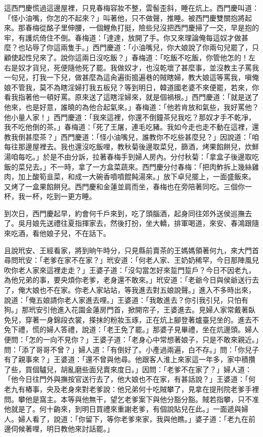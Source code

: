 這西門慶慌過這邊屋裡，只見春梅容妝不整，雲髻歪斜，睡在炕上。西門慶叫道：「怪小油嘴，你怎的不起來？」叫著他，只不做聲，推睡。被西門慶雙關抱將起來。那春梅從酩子里伸腰，一個鯉魚打挺，險些兒沒把西門慶掃了一交，早是抱的牢，有護炕倚住不倒。春梅道：「達達，放開了手。你又來理論俺每這奴才做甚麼？也玷辱了你這兩隻手。」西門慶道：「小油嘴兒，你大娘說了你兩句兒罷了，只顧使起性兒來了。說你這兩日沒吃飯？」春梅道：「吃飯不吃飯，你管他怎的！左右是奴才貨兒，死便隨他死了罷。我做奴才，也沒乾壞了甚麼事，並沒教主子罵我一句兒，打我一下兒，做甚麼為這肏遍街搗遍巷的賊瞎婦，教大娘這等罵我，嗔俺娘不管我，莫不為瞎淫婦打我五板兒？等到明日，韓道國老婆不來便罷，若來，你看我指著他一頓好罵。原來送了這瞎淫婦來，就是個禍根。」西門慶道：「就是送了他來，也是好意，誰曉的為他合起氣來。」春梅道：「他若肯放和氣些，我好罵他？他小量人家！」西門慶道：「我來這裡，你還不倒鐘茶兒我吃？那奴才手不乾凈，我不吃他倒的茶。」春梅道：「死了王屠，連毛吃豬。我如今走也走不動在這裡，還教我倒甚麼茶？」西門慶道：「怪小油嘴兒，誰教你不吃些甚麼兒？」因說道：「咱每往那邊屋裡去。我也還沒吃飯哩，教秋菊後邊取菜兒，篩酒，烤果餡餅兒，炊鮮湯咱每吃。」於是不由分訴，拉著春梅手到婦人房內。分付秋菊：「拿盒子後邊取吃飯的菜兒去。」不一時，拿了一方盒菜蔬來。西門慶分付春梅：「把肉鮓拆上幾絲雞肉，加上酸筍韭菜，和成一大碗香噴噴餛飩湯來。」放下卓兒擺上，一面盛飯來。又烤了一盒果餡餅兒。西門慶和金蓮並肩而坐，春梅也在旁陪著同吃。三個你一杯，我一杯，吃到一更方睡。

到次日，西門慶起早，約會何千戶來到，吃了頭腦酒，起身同往郊外送侯巡撫去了。吳月娘先送禮往夏指揮家去，然後打扮，坐大轎，排軍喝道，來安、春鴻跟隨來吃酒，看他娘子兒，不在話下。

且說玳安、王經看家，將到晌午時分，只見縣前賣茶的王媽媽領著何九，來大門首尋問玳安：「老爹在家不在家？」玳安道：「何老人家、王奶奶稀罕，今日那陣風兒吹你老人家來這裡走走？」王婆子道：「沒勾當怎好來踅門踅戶？今日不因老九，為他兄弟的事，要央煩你老爹，老身還不敢來。」玳安道：「老爺今日與侯爺送行去了，俺大娘也不在家。你老人家站站，等我進去對五娘說聲。」進入不多時出來，說道：「俺五娘請你老人家進去哩。」王婆道：「我敢進去？你引我引兒，只怕有狗。」那玳安引他進入花園金蓮房門首，掀開帘子，王婆進去。見婦人家常戴著臥免兒，穿著一身錦段衣裳，搽抹的粉妝玉琢，正在炕上腳登著爐臺兒坐的。進去不免下禮，慌的婦人答禮，說道：「老王免了罷。」那婆子見畢禮，坐在炕邊頭。婦人便問：「怎的一向不見你？」王婆子道：「老身心中常想著娘子，只是不敢來親近。」問：「添了哥哥不曾？」婦人道：「有倒好了。小產過兩遍，白不存。」問：「你兒子有了親事來？」王婆道：「還不曾與他尋。他跟客人淮上來家這一年多，家中積攢了些，買個驢兒，胡亂磨些面兒賣來度日。」因問：「老爹不在家了？」婦人道：「他今日往門外與撫按官送行去了，他大娘也不在家，有甚話說？」王婆道：「何老九有樁事，央及老身來對老爹說：他兄弟何十吃賊攀了，見拿在提刑院老爹手裡問。攀他是窩主。本等與他無干，望乞老爹案下與他分豁分豁。賊若指攀，只不准他就是了。何十齣來，到明日買禮來重謝老爹，有個說貼兒在此。」一面遞與婦人。婦人看了，說道：「你留下，等你老爹來家，我與他瞧。」婆子道：「老九在前邊伺候著哩，明日教他來討話罷。」

